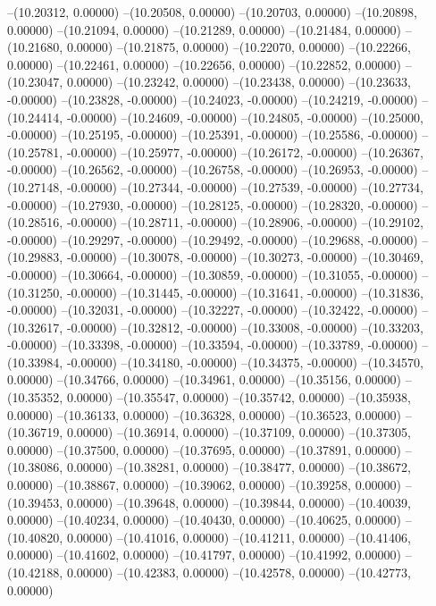 --(10.20312, 0.00000)
--(10.20508, 0.00000)
--(10.20703, 0.00000)
--(10.20898, 0.00000)
--(10.21094, 0.00000)
--(10.21289, 0.00000)
--(10.21484, 0.00000)
--(10.21680, 0.00000)
--(10.21875, 0.00000)
--(10.22070, 0.00000)
--(10.22266, 0.00000)
--(10.22461, 0.00000)
--(10.22656, 0.00000)
--(10.22852, 0.00000)
--(10.23047, 0.00000)
--(10.23242, 0.00000)
--(10.23438, 0.00000)
--(10.23633, -0.00000)
--(10.23828, -0.00000)
--(10.24023, -0.00000)
--(10.24219, -0.00000)
--(10.24414, -0.00000)
--(10.24609, -0.00000)
--(10.24805, -0.00000)
--(10.25000, -0.00000)
--(10.25195, -0.00000)
--(10.25391, -0.00000)
--(10.25586, -0.00000)
--(10.25781, -0.00000)
--(10.25977, -0.00000)
--(10.26172, -0.00000)
--(10.26367, -0.00000)
--(10.26562, -0.00000)
--(10.26758, -0.00000)
--(10.26953, -0.00000)
--(10.27148, -0.00000)
--(10.27344, -0.00000)
--(10.27539, -0.00000)
--(10.27734, -0.00000)
--(10.27930, -0.00000)
--(10.28125, -0.00000)
--(10.28320, -0.00000)
--(10.28516, -0.00000)
--(10.28711, -0.00000)
--(10.28906, -0.00000)
--(10.29102, -0.00000)
--(10.29297, -0.00000)
--(10.29492, -0.00000)
--(10.29688, -0.00000)
--(10.29883, -0.00000)
--(10.30078, -0.00000)
--(10.30273, -0.00000)
--(10.30469, -0.00000)
--(10.30664, -0.00000)
--(10.30859, -0.00000)
--(10.31055, -0.00000)
--(10.31250, -0.00000)
--(10.31445, -0.00000)
--(10.31641, -0.00000)
--(10.31836, -0.00000)
--(10.32031, -0.00000)
--(10.32227, -0.00000)
--(10.32422, -0.00000)
--(10.32617, -0.00000)
--(10.32812, -0.00000)
--(10.33008, -0.00000)
--(10.33203, -0.00000)
--(10.33398, -0.00000)
--(10.33594, -0.00000)
--(10.33789, -0.00000)
--(10.33984, -0.00000)
--(10.34180, -0.00000)
--(10.34375, -0.00000)
--(10.34570, 0.00000)
--(10.34766, 0.00000)
--(10.34961, 0.00000)
--(10.35156, 0.00000)
--(10.35352, 0.00000)
--(10.35547, 0.00000)
--(10.35742, 0.00000)
--(10.35938, 0.00000)
--(10.36133, 0.00000)
--(10.36328, 0.00000)
--(10.36523, 0.00000)
--(10.36719, 0.00000)
--(10.36914, 0.00000)
--(10.37109, 0.00000)
--(10.37305, 0.00000)
--(10.37500, 0.00000)
--(10.37695, 0.00000)
--(10.37891, 0.00000)
--(10.38086, 0.00000)
--(10.38281, 0.00000)
--(10.38477, 0.00000)
--(10.38672, 0.00000)
--(10.38867, 0.00000)
--(10.39062, 0.00000)
--(10.39258, 0.00000)
--(10.39453, 0.00000)
--(10.39648, 0.00000)
--(10.39844, 0.00000)
--(10.40039, 0.00000)
--(10.40234, 0.00000)
--(10.40430, 0.00000)
--(10.40625, 0.00000)
--(10.40820, 0.00000)
--(10.41016, 0.00000)
--(10.41211, 0.00000)
--(10.41406, 0.00000)
--(10.41602, 0.00000)
--(10.41797, 0.00000)
--(10.41992, 0.00000)
--(10.42188, 0.00000)
--(10.42383, 0.00000)
--(10.42578, 0.00000)
--(10.42773, 0.00000)
